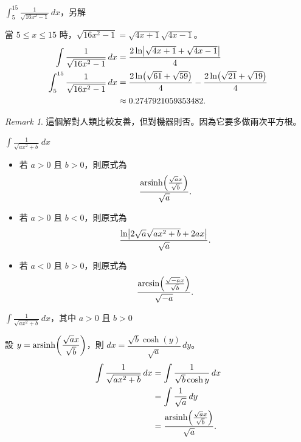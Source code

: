\documentclass{beamer}
\newcommand{\Left} {\mathopen{}\mathclose\bgroup\left}
\newcommand{\Right}{\aftergroup\egroup\right}
\newcommand{\arsinh}{\operatorname{arsinh}}
\theoremstyle{remark}
\newtheorem{remark}{Remark}
\begin{document}
\begin{CJK}{UTF8}{bsmi}
\begin{frame}{$\displaystyle \int_5^{15} \frac{1}{\sqrt{16x^2 - 1}}\,dx$，另解}
  \begin{solution}
    當 $5 \le x \le 15$ 時，$\sqrt{16x^2 - 1} = \sqrt{4x + 1} \sqrt{4x - 1}$。
    \begin{align*}
      \int \frac{1}{\sqrt{16x^2 - 1}}\,dx &= \frac{2 \ln \Left| \sqrt{4x + 1} + \sqrt{4x - 1} \Right|}{4}\\
      \int_5^{15} \frac{1}{\sqrt{16x^2 - 1}}\,dx &= \frac{2 \ln \Left( \sqrt{61} + \sqrt{59} \Right)}{4}
	  - \frac{2 \ln \Left( \sqrt{21} + \sqrt{19} \Right)}{4}\\
	&\approx 0.2747921059353482.
    \end{align*}
  \end{solution}
  \begin{remark}
    這個解對人類比較友善，但對機器則否。因為它要多做兩次平方根。
  \end{remark}
\end{frame}

\begin{frame}{$\displaystyle \int \frac{1}{\sqrt{ax^2 + b}}\,dx$}
  \begin{itemize}
    \item 若 $a > 0$ 且 $b > 0$，則原式為
      \[\frac{\arsinh \Left( \frac{\sqrt a x}{\sqrt b} \Right)}{\sqrt a}.\]
    \item 若 $a > 0$ 且 $b < 0$，則原式為
      \[\frac{\ln \Left| 2 \sqrt a \sqrt{ax^2 + b} + 2ax \Right|}{\sqrt a}.\]
    \item 若 $a < 0$ 且 $b > 0$，則原式為
      \[\frac{\arcsin \Left( \frac{\sqrt{-a}x}{\sqrt b} \Right)}{\sqrt{-a}}.\]
  \end{itemize}
\end{frame}

\begin{frame}{$\displaystyle \int \frac{1}{\sqrt{ax^2 + b}}\,dx$，其中 $a > 0$ 且 $b > 0$}
  \begin{solution}
    設 $y = \arsinh \Left( \dfrac{\sqrt a x}{\sqrt b} \Right)$，則 $dx = \dfrac{\sqrt b \cosh(y)}{\sqrt a}\,dy$。
    \begin{align*}
      \int \frac{1}{\sqrt{ax^2 + b}}\,dx &= \int \frac{1}{\sqrt b \cosh y}\,dx\\
	&= \int \frac{1}{\sqrt a}\,dy\\
	&= \frac{\arsinh \Left( \frac{\sqrt a x}{\sqrt b} \Right)}{\sqrt a}.
    \end{align*}
  \end{solution}
\end{frame}


\end{CJK}
\end{document}
